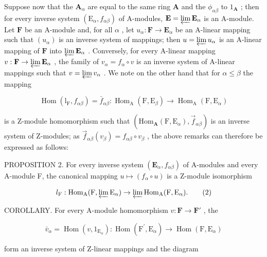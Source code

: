 Suppose now that the \(\mathbf{A}_{\alpha}\) are equal to the same ring \(\mathbf{A}\) and the \(\phi_{\alpha \beta}\) to \(1_{\mathbf{A}}\) ; then for every inverse system \((\mathrm{E}_{\alpha}, f_{\alpha \beta})\) of A-modules, \(\mathbf{E} = \varprojlim \mathbf{E}_{\alpha}\) is an A-module. Let \(\mathbf{F}\) be an A-module and, for all \(\alpha\) , let \(u_{\alpha}: \mathbf{F} \to \mathbf{E}_{\alpha}\) be an A-linear mapping such that \((u_{\alpha})\) is an inverse system of mappings; then \(u = \varprojlim u_{\alpha}\) is an A-linear mapping of \(\mathbf{F}\) into \(\varprojlim \mathbf{E}_{\alpha}\) . Conversely, for every A-linear mapping \(v: \mathbf{F} \to \varprojlim \mathbf{E}_{\alpha}\) , the family of \(v_{\alpha} = f_{\alpha} \circ v\) is an inverse system of A-linear mappings such that \(v = \varprojlim v_{\alpha}\) . We note on the other hand that for \(\alpha \leqslant \beta\) the mapping

\[
\operatorname{Hom} \left(\mathrm{l} _ {\mathrm{F}}, f _ {\alpha \beta}\right) = \bar {f} _ {\alpha \beta}: \operatorname{Hom} _ {\mathrm{A}} (\mathrm{F}, \mathrm{E} _ {\beta}) \rightarrow \operatorname{Hom} _ {\mathrm{A}} (\mathrm{F}, \mathrm{E} _ {\alpha})
\]

is a Z-module homomorphism such that \((\mathrm{Hom}_{\mathbf{A}}(\mathrm{F}, \mathrm{E}_{\alpha}), \vec{f}_{\alpha\beta})\) is an inverse system of Z-modules; as \(\vec{f}_{\alpha\beta}(v_{\beta}) = f_{\alpha\beta} \circ v_{\beta}\) , the above remarks can therefore be expressed as follows:

PROPOSITION 2. For every inverse system \((\mathbf{E}_{\alpha}, f_{\alpha \beta})\) of A-modules and every A-module F, the canonical mapping \(u \mapsto (f_{\alpha} \circ u)\) is a Z-module isomorphism

\[
l _ {\mathrm{F}}: \operatorname{Hom} _ {\mathrm{A}} (\mathrm{F}, \varprojlim \mathrm{E} _ {\alpha}) \rightarrow \varprojlim \operatorname{Hom} _ {\mathrm{A}} (\mathrm{F}, \mathrm{E} _ {\alpha}).\tag{2}
\]

COROLLARY. For every A-module homomorphism \(v: \mathbf{F} \to \mathbf{F}'\) , the

\[
\bar {v} _ {\alpha} = \operatorname{Hom} (v, 1 _ {\mathrm{E} _ {\alpha}}): \operatorname{Hom} (\mathrm{F} ^ {\prime}, \mathrm{E} _ {\alpha}) \rightarrow \operatorname{Hom} (\mathrm{F}, \mathrm{E} _ {\alpha})
\]

form an inverse system of Z-linear mappings and the diagram

